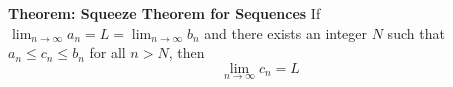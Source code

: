 \nopagenumbers
{\bf Theorem: Squeeze Theorem for Sequences}
\vskip 6pt
If $\lim_{n\to\infty}a_n=L=\lim_{n\to\infty}b_n$ and there exists an integer $N$ such that $a_n \leq c_n \leq b_n$ for all $n>N$, then $$\lim_{n\to\infty}c_n=L$$

\vfill\eject
